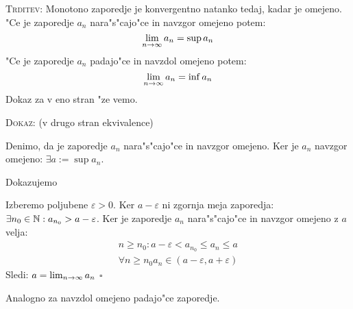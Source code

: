 \textsc{Trditev:} Monotono zaporedje je konvergentno natanko tedaj, kadar je omejeno. "Ce je zaporedje $a_n$ nara"s"cajo"ce in navzgor omejeno potem:
\begin{equation*}
\lim_{n \rightarrow \infty}a_n = \sup a_n
\end{equation*}
"Ce je zaporedje $a_n$ padajo"ce in navzdol omejeno potem:
\begin{equation*}
\lim_{n \rightarrow \infty}a_n = \inf a_n
\end{equation*}
Dokaz za v eno stran "ze vemo.

\textsc{Dokaz: } (v drugo stran ekvivalence)

Denimo, da je zaporedje $a_n$ nara"s"cajo"ce in navzgor omejeno. Ker je $a_n$ navzgor omejeno: $\exists a := \sup a_n$.

Dokazujemo 

Izberemo poljubene $\varepsilon > 0$. Ker $a - \varepsilon$ ni zgornja meja zaporedja: $\exists n_0 \in \mathbb{N}: a_{n_0} > a - \varepsilon$. Ker je zaporedje $a_n$ nara"s"cajo"ce in navzgor omejeno z $a$ velja:
\begin{gather*}
n \geq n_0: a-\varepsilon < a_{n_0} \leq a_n \leq a\\
\forall n \geq n_0 a_n \in (a - \varepsilon, a + \varepsilon)
\end{gather*}
Sledi: $a = \lim_{n \rightarrow \infty}a_n$ \hfill $\square$

Analogno za navzdol omejeno padajo"ce zaporedje.